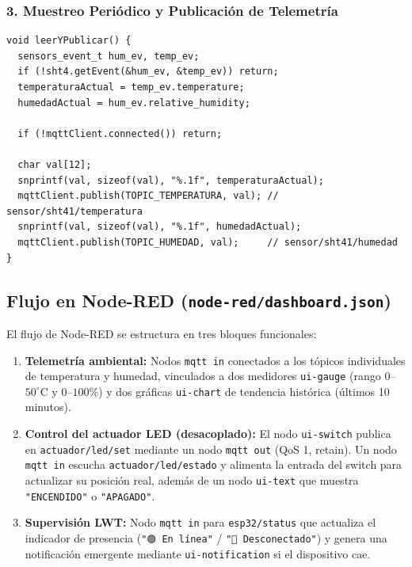 \subsubsection{3. Muestreo Periódico y Publicación de Telemetría}
\begin{lstlisting}[style=customcpp]
void leerYPublicar() {
  sensors_event_t hum_ev, temp_ev;
  if (!sht4.getEvent(&hum_ev, &temp_ev)) return;
  temperaturaActual = temp_ev.temperature;
  humedadActual = hum_ev.relative_humidity;

  if (!mqttClient.connected()) return;

  char val[12];
  snprintf(val, sizeof(val), "%.1f", temperaturaActual);
  mqttClient.publish(TOPIC_TEMPERATURA, val); // sensor/sht41/temperatura
  snprintf(val, sizeof(val), "%.1f", humedadActual);
  mqttClient.publish(TOPIC_HUMEDAD, val);     // sensor/sht41/humedad
}
\end{lstlisting}

\subsection{Flujo en Node-RED (\texttt{node-red/dashboard.json})}
El flujo de Node-RED se estructura en tres bloques funcionales:
\begin{enumerate}[noitemsep]
    \item \textbf{Telemetría ambiental:} Nodos \texttt{mqtt in} conectados a los tópicos individuales de temperatura y humedad, vinculados a dos medidores \texttt{ui-gauge} (rango $0$--$50^\circ\text{C}$ y $0$--$100\%$) y dos gráficas \texttt{ui-chart} de tendencia histórica (últimos 10 minutos).
    \item \textbf{Control del actuador LED (desacoplado):} El nodo \texttt{ui-switch} publica en \texttt{actuador/led/set} mediante un nodo \texttt{mqtt out} (QoS 1, retain). Un nodo \texttt{mqtt in} escucha \texttt{actuador/led/estado} y alimenta la entrada del switch para actualizar su posición real, además de un nodo \texttt{ui-text} que muestra \texttt{"ENCENDIDO"} o \texttt{"APAGADO"}.
    \item \textbf{Supervisión LWT:} Nodo \texttt{mqtt in} para \texttt{esp32/status} que actualiza el indicador de presencia (\texttt{"🟢 En línea"} / \texttt{"🔴 Desconectado"}) y genera una notificación emergente mediante \texttt{ui-notification} si el dispositivo cae.
\end{enumerate}
